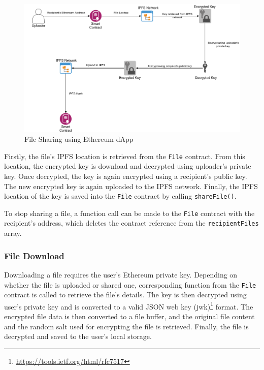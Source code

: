 				\begin{figure}[h]
					\includegraphics[width=\linewidth]{figures/ethereum-share}
					\caption{\label{fig:ethereum-share} File Sharing using Ethereum dApp}
				\end{figure}
				
				Firstly, the file's IPFS location is retrieved from the \texttt{File} contract. From this location, the encrypted key is download and decrypted using uploader's private key. Once decrypted, the key is again encrypted using a recipient's public key. The new encrypted key is again uploaded to the IPFS network. Finally, the IPFS location of the key is saved into the \texttt{File} contract by calling \texttt{shareFile()}.
				
				To stop sharing a file, a function call can be made to the \texttt{File} contract with the recipient's address, which deletes the contract reference from the \texttt{recipientFiles} array.
			
			\subsubsection{File Download}
				Downloading a file requires the user's Ethereum private key. Depending on whether the file is uploaded or shared one, corresponding function from the \texttt{File} contract is called to retrieve the file's details. The key is then decrypted using user's private key and is converted to a valid JSON web key (jwk)\footnote{\url{https://tools.ietf.org/html/rfc7517}} format. The encrypted file data is then converted to a file buffer, and the original file content and the random salt used for encrypting the file is retrieved. Finally, the file is decrypted and saved to the user's local storage.
			
